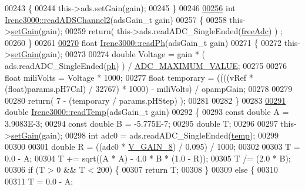 \begin{DoxyCode}
00243 \{
00244     this->ads.setGain(gain);
00245 \}
00246 
\hyperlink{class_irene3000_ae73bd2ed14a199a7e83f4d6458476a7c}{00256} \textcolor{keywordtype}{int} \hyperlink{class_irene3000_ae73bd2ed14a199a7e83f4d6458476a7c}{Irene3000::readADSChannel2}(adsGain\_t gain)
00257 \{   
00258     this->\hyperlink{class_irene3000_aff7c5da186b388e7272e63ff88a20c34}{setGain}(gain);
00259     \textcolor{keywordflow}{return}( this->ads.readADC\_SingleEnded(\hyperlink{_irene3000_8h_a55497513af255250e464ed76543d46d7}{freeAdc}) ) ;
00260 \}
00261 
\hyperlink{class_irene3000_abf3db725fabb0634ec889b32068a5eec}{00270} \textcolor{keywordtype}{float} \hyperlink{class_irene3000_abf3db725fabb0634ec889b32068a5eec}{Irene3000::readPh}(adsGain\_t gain)
00271 \{
00272   this->\hyperlink{class_irene3000_aff7c5da186b388e7272e63ff88a20c34}{setGain}(gain);
00273 
00274   \textcolor{keywordtype}{double} Voltage =  gain * ( ads.readADC\_SingleEnded(\hyperlink{_irene3000_8h_af771ceafe0e6524dd8497d4305dfe778}{ph}) ) / \hyperlink{_irene3000_8h_ae04444a85a37b5dce09107f2ce2b2c80}{ADC\_MAXIMUM\_VALUE};
00275 
00276   \textcolor{keywordtype}{float} miliVolts = Voltage * 1000;
00277   \textcolor{keywordtype}{float} temporary = ((((vRef * (float)params.pH7Cal) / 32767) * 1000) - miliVolts) / opampGain;
00278 
00279 
00280  \textcolor{keywordflow}{return}( 7 - (temporary / params.pHStep) );
00281 
00282 \}
00283 
\hyperlink{class_irene3000_a94ad40f281d83ad1be20bf1edd6fe802}{00291} \textcolor{keywordtype}{double} \hyperlink{class_irene3000_a94ad40f281d83ad1be20bf1edd6fe802}{Irene3000::readTemp}(adsGain\_t gain)
00292 \{
00293   \textcolor{keyword}{const} \textcolor{keywordtype}{double} A = 3.9083E-3;
00294   \textcolor{keyword}{const} \textcolor{keywordtype}{double} B = -5.775E-7;
00295   \textcolor{keywordtype}{double} T;
00296   
00297   this->\hyperlink{class_irene3000_aff7c5da186b388e7272e63ff88a20c34}{setGain}(gain);
00298   \textcolor{keywordtype}{int} adc0 = ads.readADC\_SingleEnded(\hyperlink{_irene3000_8h_a5905d48604152cf57aa6bfa087b49173}{temp});
00299  
00300 
00301   \textcolor{keywordtype}{double} R = ((adc0 * \hyperlink{_irene3000_8h_ab7ab16df599d3f0ce29e12791a504891}{V\_GAIN\_8}) / 0.095) / 1000;
00302 
00303   T = 0.0 - A;
00304   T += sqrt((A * A) - 4.0 * B * (1.0 - R));
00305   T /= (2.0 * B);
00306   \textcolor{keywordflow}{if} (T > 0 && T < 200) \{
00307     \textcolor{keywordflow}{return} T;
00308   \}
00309   \textcolor{keywordflow}{else} \{
00310   
00311     T = 0.0 - A;

\end{DoxyCode}
